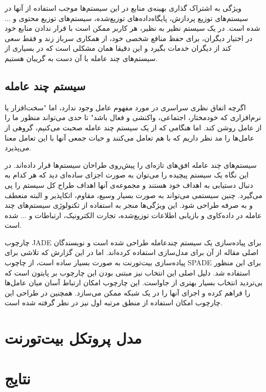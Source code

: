 \documentclass{article}
\begin{document}
ویژگی به اشتراک گذاری بهینه‌ی منابع در این سیستم‌ها موجب استفاده از آنها در سیستم‌های توزیع پردازش، پایگاه‌داده‌های توزیع‌شده، سیستم‌های توزیع محتوی و ... شده است. در یک سیستم نظیر به نظیر، هر کاربر ممکن است با قرار ندادن منابع خود در اختیار دیگران، برای حفظ منافع شخصی خود، از همکاری سرباز زند و فقط سعی کند از دیگران خدمات بگیرد و این دقیقا همان مشکلی است که در بسیاری از سیستم‌های چند عامله با آن دست به گریبان هستیم.  

\subsection{سیستم چند عامله}
اگرچه اتفاق نظری سراسری در مورد مفهوم عامل وجود ندارد، اما "سخت‌افزار یا نرم‌افزاری که خودمختار، اجتماعی، واکنشی و فعال باشد"\cite{wooldridge} تا حدی می‌تواند منظور ما را از عامل روشن کند. اما هنگامی که از یک سیستم چند عامله صحبت می‌کنیم، گروهی از عامل‌ها را مد نظر داریم که با هم تعامل می‌کنند و حیات جمعی آنها با این تعامل معنا می‌پذیرد.

سیستم‌های چند عامله افق‌های تازه‌ای را پیش‌روی طراحان سیستم‌ها قرار داده‌اند. در این نگاه یک سیستم پیچیده را می‌توان به صورت اجزای ساده‌ای دید که هر کدام به دنبال دستیابی به اهداف خود هستند و مجموعه‌ی آنها اهداف طراح کل سیستم را پی می‌گیرد. چنین سیستمی می‌تواند به صورت بسیار وسیع، مقاوم، اتکاپذیر و البته منعطف و به صرفه طراحی شود. این ویژگی‌ها منجر به استفاده از تکنولوژی سیستم‌های چند عامله در داده‌کاوی و بازیابی اطلاعات توزیع‌شده، تجارت الکترونیک، ارتباطات و ... شده است.

چارچوب JADE برای پیاده‌سازی یک سیستم چندعامله طراحی شده است و نویسندگان اصلی مقاله از آن برای مدل‌سازی استفاده کرده‌اند. اما در این گزارش که تلاشی برای پیاده‌سازی بیت‌تورنت به صورت بسیار ساده است، از چاچوب SPADE برای این منظور استفاده شد. دلیل اصلی این انتخاب نیز مبتنی بودن این چارچوب بر پایتون است که بی‌تردید انتخاب بسیار بهتری از جاواست. این چارچوب امکان ارتباط آسان میان عامل‌ها را فراهم کرده و اجرای آنها را در یک شبکه ممکن می‌سازد. همچنین در طراحی این چارچوب امکان استفاده از منطق مرتبه اول نیز در نظر گرفته شده است. 

\section{مدل پروتکل بیت‌تورنت}

\section{نتایج}
\end{document}
